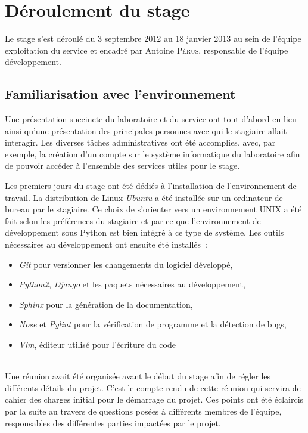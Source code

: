\documentclass[12pt,a4paper,twoside]{report}
\begin{document}
\newpage

\section{Déroulement du stage}

Le stage s’est déroulé du 3 septembre 2012 au 18 janvier 2013 au sein de
l’équipe exploitation du service et encadré par Antoine \textsc{Pérus},
responsable de l’équipe développement.

\subsection{Familiarisation avec l’environnement}

Une présentation succincte du laboratoire et du service ont tout d’abord eu lieu
ainsi qu’une présentation des principales personnes avec qui le
stagiaire allait interagir. Les diverses tâches administratives ont été
accomplies, avec, par exemple, la création d’un compte sur le système
informatique du laboratoire afin de pouvoir accéder à l’ensemble des services
utiles pour le stage.

Les premiers jours du stage ont été dédiés à l’installation de l’environnement
de travail. La distribution de Linux \emph{Ubuntu} a été installée sur un
ordinateur de bureau par le stagiaire. Ce choix de s’orienter vers un
environnement UNIX a été fait selon les préférences du stagiaire et par ce que
l’environnement de développement sous Python est bien intégré à ce type de
système. Les outils nécessaires au développement ont ensuite été installés~:

\begin{itemize}
	\item \emph{Git} pour versionner les changements du logiciel développé,
	\item \emph{Python2}, \emph{Django} et les paquets nécessaires au
	développement,
	\item \emph{Sphinx} pour la génération de la documentation,
	\item \emph{Nose} et \emph{Pylint} pour la vérification de programme et la
	détection de bugs,
	\item \emph{Vim}, éditeur utilisé pour l’écriture du code
\end{itemize}
~\\

Une réunion avait été organisée avant le début du stage afin de régler
les différents détails du projet. C’est le compte rendu de cette réunion qui
servira de cahier des charges initial pour le démarrage du projet. Ces points
ont été éclaircis par la suite au travers de questions posées à différents
membres de l’équipe, responsables des différentes parties impactées par le
projet.\\
\end{document}
